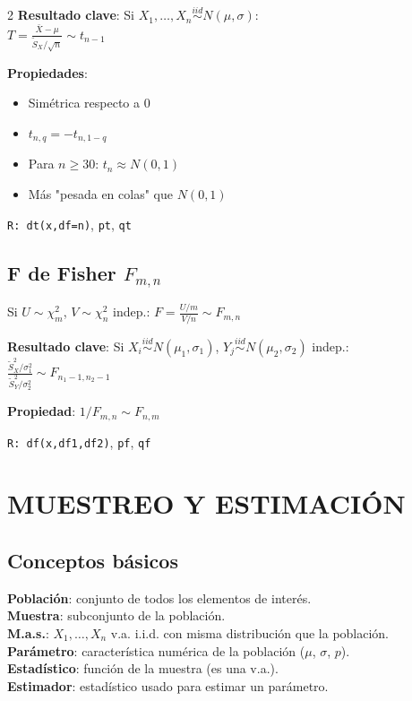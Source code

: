 \documentclass[9pt,a4paper]{article}
\newcommand{\R}{\texttt{R: }}
\begin{document}
\begin{multicols}{2}
\textbf{Resultado clave}: Si $X_1,\ldots,X_n\stackrel{iid}{\sim}N(\mu,\sigma)$:\\
$T=\frac{\bar{X}-\mu}{\tilde{S}_X/\sqrt{n}}\sim t_{n-1}$

\textbf{Propiedades}:
\begin{itemize}[leftmargin=*]
\item Simétrica respecto a 0
\item $t_{n,q}=-t_{n,1-q}$
\item Para $n\geq 30$: $t_n\approx N(0,1)$
\item Más "pesada en colas" que $N(0,1)$
\end{itemize}

\R\texttt{dt(x,df=n)}, \texttt{pt}, \texttt{qt}

\subsection{F de Fisher $F_{m,n}$}
Si $U\sim\chi^2_m$, $V\sim\chi^2_n$ indep.: $F=\frac{U/m}{V/n}\sim F_{m,n}$

\textbf{Resultado clave}: Si $X_i\stackrel{iid}{\sim}N(\mu_1,\sigma_1)$, $Y_j\stackrel{iid}{\sim}N(\mu_2,\sigma_2)$ indep.:\\
$\frac{\tilde{S}^2_X/\sigma_1^2}{\tilde{S}^2_Y/\sigma_2^2}\sim F_{n_1-1,n_2-1}$

\textbf{Propiedad}: $1/F_{m,n}\sim F_{n,m}$

\R\texttt{df(x,df1,df2)}, \texttt{pf}, \texttt{qf}

\section{MUESTREO Y ESTIMACIÓN}

\subsection{Conceptos básicos}
\textbf{Población}: conjunto de todos los elementos de interés.\\
\textbf{Muestra}: subconjunto de la población.\\
\textbf{M.a.s.}: $X_1,\ldots,X_n$ v.a. i.i.d. con misma distribución que la población.\\
\textbf{Parámetro}: característica numérica de la población ($\mu$, $\sigma$, $p$).\\
\textbf{Estadístico}: función de la muestra (es una v.a.).\\
\textbf{Estimador}: estadístico usado para estimar un parámetro.


\end{multicols}
\end{document}
